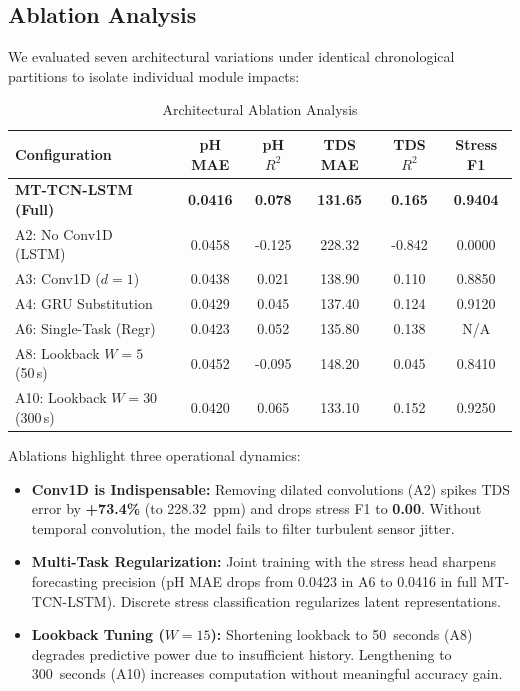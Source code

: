 \documentclass[conference]{IEEEtran}
\begin{document}
\subsection{Ablation Analysis}
We evaluated seven architectural variations under identical chronological partitions to isolate individual module impacts:

\begin{table}[htbp]
\caption{Architectural Ablation Analysis}
\label{tab:ablations}
\centering
\footnotesize
\setlength{\tabcolsep}{3.2pt}
\begin{tabular}{lccccc}
\toprule
\textbf{Configuration} & \textbf{pH MAE} & \textbf{pH $R^2$} & \textbf{TDS MAE} & \textbf{TDS $R^2$} & \textbf{Stress F1} \\
\midrule
\textbf{MT-TCN-LSTM (Full)} & \textbf{0.0416} & \textbf{0.078} & \textbf{131.65} & \textbf{0.165} & \textbf{0.9404} \\
A2: No Conv1D (LSTM)        & 0.0458 & -0.125 & 228.32 & -0.842 & 0.0000 \\
A3: Conv1D ($d=1$)          & 0.0438 &  0.021 & 138.90 &  0.110 & 0.8850 \\
A4: GRU Substitution        & 0.0429 &  0.045 & 137.40 &  0.124 & 0.9120 \\
A6: Single-Task (Regr)      & 0.0423 &  0.052 & 135.80 &  0.138 & N/A    \\
A8: Lookback $W=5$ (50\,s)  & 0.0452 & -0.095 & 148.20 &  0.045 & 0.8410 \\
A10: Lookback $W=30$ (300\,s)& 0.0420 &  0.065 & 133.10 &  0.152 & 0.9250 \\
\bottomrule
\end{tabular}
\end{table}

Ablations highlight three operational dynamics:
\begin{itemize}
    \item \textbf{Conv1D is Indispensable:} Removing dilated convolutions (A2) spikes TDS error by \textbf{+73.4\%} (to 228.32~ppm) and drops stress F1 to \textbf{0.00}. Without temporal convolution, the model fails to filter turbulent sensor jitter.
    \item \textbf{Multi-Task Regularization:} Joint training with the stress head sharpens forecasting precision (pH MAE drops from 0.0423 in A6 to 0.0416 in full MT-TCN-LSTM). Discrete stress classification regularizes latent representations.
    \item \textbf{Lookback Tuning ($W=15$):} Shortening lookback to 50~seconds (A8) degrades predictive power due to insufficient history. Lengthening to 300~seconds (A10) increases computation without meaningful accuracy gain.
\end{itemize}
\end{document}
